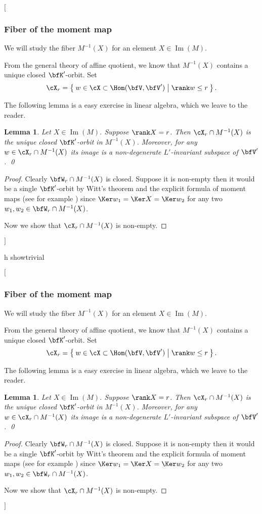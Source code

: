 \documentclass[12pt,a4paper]{amsart}
\newcommand{\trivial}[2][]{\if\relax\detokenize{#1}\relax
  {%
      \color{orange} \vspace{0em} $[$  #2 $]$
      \color{black}
  }
  \else
\ifx#1h
\ifcsname showtrivial\endcsname
{%
    \color{orange} \vspace{0em}  $[$ #2 $]$
    \color{black}
}
\fi
\else {\red Wrong argument!} \fi
\fi
}
\def\Im{\operatorname{Im}}
\numberwithin{equation}{section}
\newtheorem{lem}[thm]{Lemma}
\theoremstyle{remark}
\def\MMP{M}
\begin{document}
\trivial[]{
\subsubsection{Fiber of the moment map}\label{sec:F.M}

We will study the fiber $M^{-1}(X)$ for an element $X\in \Im(M)$. %

From the general theory of affine quotient, we know that
  $M^{-1}(X)$ contains a unique closed $\bfK'$-orbit.
Set
\[
\cX_r = \Set{w\in \cX\subset \Hom(\bfV,\bfV')| \rank w\leq r}.
\]

The following lemma is a easy exercise in linear algebra, which we leave to the reader.
\begin{lem}\label{lem:F.cl}
Let $X\in\Im(\MMP)$. Suppose $\rank X = r$.
Then $\cX_r\cap \MMP^{-1}(X)$ is the unique closed $\bfK'$-orbit in $\MMP^{-1}(X)$.
Moreover, for any $w\in \cX_r\cap \MMP^{-1}(X)$ its image is a non-degenerate
$L'$-invariant subspace of $\bfV'$. \qed
\end{lem}

\begin{proof}
  Clearly $\bfW_r\cap \MMP^{-1}(X)$ is closed. Suppose it is non-empty then it
  would be a single $\bfK'$-orbit by Witt's theorem \cite[3.7.1]{Howe95} and the
  explicit formula of moment maps (see for example \cite[Appendix A]{LM}) since
  $\Ker w_1 = \Ker X = \Ker w_2$ for any two $w_1, w_2 \in \bfW_r \cap \MMP^{-1}(X)$.

  Now we show that $\cX_r\cap \MMP^{-1}(X)$ is non-empty.


\end{proof}}
\end{document}
